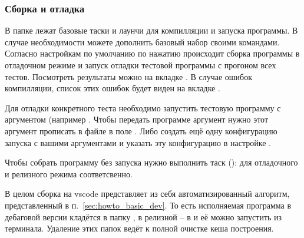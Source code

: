 \subsubsection{Сборка и отладка}
В папке  лежат базовые таски и лаунчи для компилляции и запуска программы.
В случае необходимости можете дополнить базовый набор своими командами.
Согласно настройкам по умолчанию
по нажатию  происходит сборка программы в отладочном режиме и запуск отладки
тестовой программы с прогоном всех тестов.
Посмотреть результаты можно на вкладке .
В случае ошибок компилляции, список этих ошибок будет виден на вкладке .

Для отладки конкретного теста необходимо запустить тестовую программу с аргументом (например .
Чтобы передать программе аргумент нужно этот аргумент прописать в файле 
в поле . Либо создать ещё одну конфигурацию запуска с вашими аргументами и указать эту конфигурацию в настройке .

Чтобы собрать программу без запуска нужно выполнить таск (): 
для отладочного и релизного режима соответсвенно. 

В целом сборка на vscode представляет из себя автоматизированный алгоритм, представленный в п.~\ref{sec:howto_basic_dev}.
То есть исполняемая программа в дебаговой версии кладётся в папку , в релизной -- в  и её можно запустить из терминала.
Удаление этих папок ведёт к полной очистке кеша построения.

